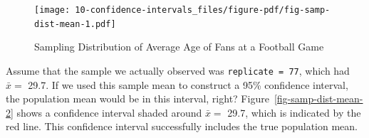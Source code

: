 \documentclass[
  letterpaper,
  DIV=11,
  numbers=noendperiod]{scrreprt}
\newenvironment{Shaded}{\begin{snugshade}}{\end{snugshade}}
\newcommand{\AttributeTok}[1]{\textcolor[rgb]{0.40,0.45,0.13}{#1}}
\newcommand{\DecValTok}[1]{\textcolor[rgb]{0.68,0.00,0.00}{#1}}
\newcommand{\FunctionTok}[1]{\textcolor[rgb]{0.28,0.35,0.67}{#1}}
\newcommand{\NormalTok}[1]{\textcolor[rgb]{0.00,0.23,0.31}{#1}}
\newcommand{\OtherTok}[1]{\textcolor[rgb]{0.00,0.23,0.31}{#1}}
\newcommand{\SpecialCharTok}[1]{\textcolor[rgb]{0.37,0.37,0.37}{#1}}
\newcommand{\StringTok}[1]{\textcolor[rgb]{0.13,0.47,0.30}{#1}}
\theoremstyle{definition}
\theoremstyle{remark}
\begin{document}
\begin{Shaded}
\end{Shaded}

\begin{figure}[H]

{\centering \texttt{[image: 10-confidence-intervals\_files/figure-pdf/fig-samp-dist-mean-1.pdf]}

}

\caption{\label{fig-samp-dist-mean}Sampling Distribution of Average Age
of Fans at a Football Game}

\end{figure}

Assume that the sample we actually observed was
\texttt{replicate\ =\ 77}, which had \(\bar{x} =\) 29.7. If we used this
sample mean to construct a 95\% confidence interval, the population mean
would be in this interval, right? Figure~\ref{fig-samp-dist-mean-2}
shows a confidence interval shaded around \(\bar{x} =\) 29.7, which is
indicated by the red line. This confidence interval successfully
includes the true population mean.
\end{document}
